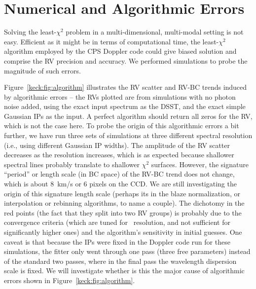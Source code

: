 


\section{Numerical and Algorithmic Errors}\label{keck:sec:algorithm}

Solving the least-$\chi^2$ problem in a multi-dimensional, multi-modal
setting is not easy. Efficient as it might be in terms of
computational time, the least-$\chi^2$ algorithm employed by the CPS
Doppler code could give biased solution and comprise the RV precision
and accuracy. We performed simulations to probe the magnitude of such
errors.

Figure~\ref{keck:fig:algorithm} illustrates the RV scatter and RV-BC
trends induced by algorithmic errors -- the RVs plotted are from
simulations with no photon noise added, using the exact input spectrum
as the DSST, and the exact simple Gaussian IPs as the input. A perfect
algorithm should return all zeros for the RV, which is not the case
here. To probe the origin of this algorithmic errors a bit further, we
have run three sets of simulations at three different spectral
resolution (i.e., using different Gaussian IP widths). The amplitude
of the RV scatter decreases as the resolution increases, which is as
expected because shallower spectral lines probably translate to
shallower $\chi^2$ surfaces. However, the signature ``period'' or
length scale (in BC space) of the RV-BC trend does not change, which
is about 8~km/s or 6 pixels on the CCD. We are still investigating the
origin of this signature length scale (perhaps its in the blaze
normalization, or interpolation or rebinning algorithms, to name a
couple). The dichotomy in the red points (the fact that they split
into two RV groups) is probably due to the convergence criteria (which
are tuned for \keck\ resolution, and not sufficient for significantly
higher ones) and the algorithm's sensitivity in initial guesses. One
caveat is that because the IPs were fixed in the Doppler code run for
these simulations, the fitter only went through one pass (three free
parameters) instead of the standard two passes, where in the final
pass the wavelength dispersion scale is fixed. We will investigate
whether is this the major cause of algorithmic errors shown in
Figure~\ref{keck:fig:algorithm}. 


